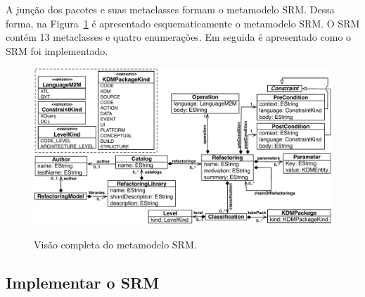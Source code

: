A junção dos pacotes e suas metaclasses formam o metamodelo SRM. Dessa forma, na Figura~\ref{fig:meta_modelo_SRM} é apresentado esquematicamente o metamodelo SRM. O SRM contém 13 metaclasses e quatro enumerações. Em seguida é apresentado como o SRM foi implementado.

\begin{figure}[h]
	\centering
		\caption{Visão completa do metamodelo SRM.}
	\includegraphics[scale=0.65]{images/newMetamodelSRM}
	\label{fig:meta_modelo_SRM}
	\fautor
\end{figure}




\subsection{Implementar o SRM}\label{sec:implementacao_do_SRM}

